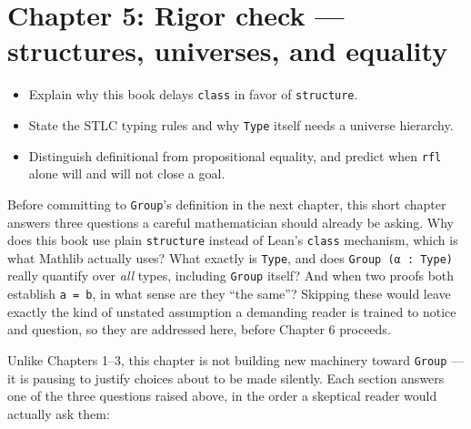 \chapter{Chapter 5: Rigor check --- structures, universes, and equality}\label{sec:05-rigor-check:00-index:1}

\begin{learningobjectives}
\begin{itemize}
\tightlist
\item
  Explain why this book delays \texttt{class} in favor of \texttt{structure}.
\item
  State the STLC typing rules and why \texttt{Type} itself needs a universe hierarchy.
\item
  Distinguish definitional from propositional equality, and predict when \texttt{rfl} alone will and will not close a goal.
\end{itemize}
\end{learningobjectives}


Before committing to \texttt{Group}'s definition in the next chapter, this short chapter answers three questions a careful mathematician should already be asking. Why does this book use plain \texttt{structure} instead of Lean's \texttt{class} mechanism, which is what Mathlib actually uses? What exactly is \texttt{Type}, and does \texttt{Group (α : Type)} really quantify over \emph{all} types, including \texttt{Group} itself? And when two proofs both establish \texttt{a = b}, in what sense are they ``the same''? Skipping these would leave exactly the kind of unstated assumption a demanding reader is trained to notice and question, so they are addressed here, before Chapter 6 proceeds.

Unlike Chapters 1--3, this chapter is not building new machinery toward \texttt{Group} --- it is pausing to justify choices about to be made silently. Each section answers one of the three questions raised above, in the order a skeptical reader would actually ask them:

